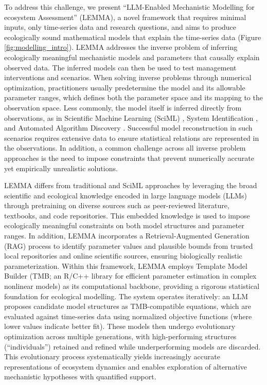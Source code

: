 To address this challenge, we present ``LLM-Enabled Mechanistic Modelling for ecosystem Assessment'' (LEMMA), a novel framework that requires minimal inputs, only time-series data and research questions, and aims to produce ecologically sound mathematical models that explain the time-series data (Figure \ref{fig:modelling_intro}). LEMMA addresses the inverse problem of inferring ecologically meaningful mechanistic models and parameters that causally explain observed data. The inferred models can then be used to test management interventions and scenarios. When solving inverse problems through numerical optimization, practitioners usually predetermine the model and its allowable parameter ranges, which defines both the parameter space and its mapping to the observation space. Less commonly, the model itself is inferred directly from observations, as in Scientific Machine Learning (SciML) \citep{willard2022integrating}, System Identification \citep{chiuso2019system}, and Automated Algorithm Discovery \citep{blazek2024automated}. Successful model reconstruction in such scenarios requires extensive data to ensure statistical relations are represented in the observations. In addition, a common challenge across all inverse problem approaches is the need to impose constraints that prevent numerically accurate yet empirically unrealistic solutions.

LEMMA differs from traditional and SciML approaches by leveraging the broad scientific and ecological knowledge encoded in large language models (LLMs) through pretraining on diverse sources such as peer-reviewed literature, textbooks, and code repositories. This embedded knowledge is used to impose ecologically meaningful constraints on both model structures and parameter ranges. In addition, LEMMA incorporates a Retrieval-Augmented Generation (RAG) process to identify parameter values and plausible bounds from trusted local repositories and online scientific sources, ensuring biologically realistic parameterization. Within this framework, LEMMA employs Template Model Builder (TMB; an R/C++ library for efficient parameter estimation in complex nonlinear models) as its computational backbone, providing a rigorous statistical foundation for ecological modelling. The system operates iteratively: an LLM proposes candidate model structures as TMB-compatible equations, which are evaluated against time-series data using normalized objective functions (where lower values indicate better fit). These models then undergo evolutionary optimization across multiple generations, with high-performing structures (``individuals'') retained and refined while underperforming models are discarded. This evolutionary process systematically yields increasingly accurate representations of ecosystem dynamics and enables exploration of alternative mechanistic hypotheses with quantified support.

